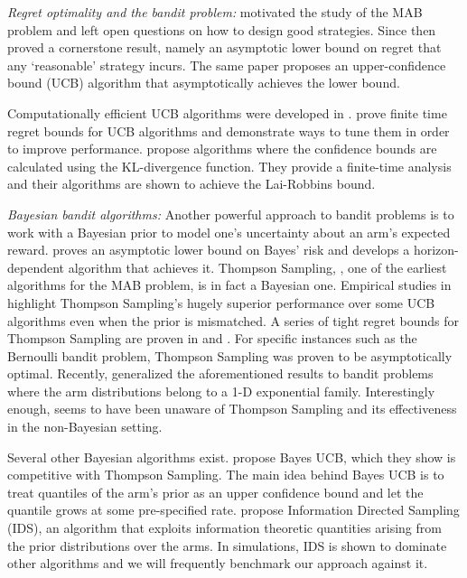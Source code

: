 \noindent\emph{Regret optimality and the bandit problem: }\cite{robbins1952some} motivated the study of the MAB problem and left open questions on how to design good strategies. Since then \cite{lai1985asymptotically} proved a cornerstone result, namely an asymptotic lower bound on regret that any `reasonable' strategy incurs. The same paper proposes an upper-confidence bound (UCB) algorithm that asymptotically achieves the  lower bound.

Computationally efficient UCB algorithms were developed in \cite{agrawal1995sample,katehakis1995sequential}. \cite{auer2002finite,audibert2010regret} prove finite time regret bounds for UCB algorithms and demonstrate ways to tune them in order to improve performance. \cite{garivier2011kl,maillard2011finite} propose algorithms where the confidence bounds are calculated using the KL-divergence function. They provide a finite-time analysis and their algorithms are shown to achieve the Lai-Robbins bound.

\noindent\emph{Bayesian bandit algorithms: } Another powerful approach to bandit problems is to work with a Bayesian prior to model one's uncertainty about an arm's expected reward. \cite{lai1987adaptive}  proves an asymptotic lower bound on Bayes' risk and develops a horizon-dependent algorithm that achieves it.
Thompson Sampling, \cite{thompson1933likelihood}, one of the earliest algorithms for the MAB problem, is in fact a Bayesian one. Empirical studies in \cite{chapelle2011empirical,scott2010modern} highlight Thompson Sampling's hugely superior performance over some UCB algorithms even when the prior is mismatched. A series of tight regret bounds for Thompson Sampling are proven in \cite{agrawalanalysis,agrawal2013further} and \cite{kaufmann2012thompson}. For specific instances such as the Bernoulli bandit problem, Thompson Sampling was proven to be asymptotically optimal. Recently, \cite{korda2013thompson} generalized the aforementioned results to bandit problems where the arm distributions belong to a 1-D exponential family. Interestingly enough, \cite{robbins1952some} seems to have been unaware of Thompson Sampling and its effectiveness in the non-Bayesian setting.

Several other Bayesian algorithms exist. \cite{kaufmann2012thompson} propose Bayes UCB, which they show is competitive with Thompson Sampling. The main idea behind Bayes UCB is to treat quantiles of the arm's prior as an upper confidence bound and let the quantile grows at some pre-specified rate. \cite{russo2014learning} propose Information Directed Sampling (IDS), an algorithm that exploits information theoretic quantities arising from the prior distributions over the arms. In simulations, IDS is shown to dominate other algorithms and we will frequently benchmark our approach against it.

